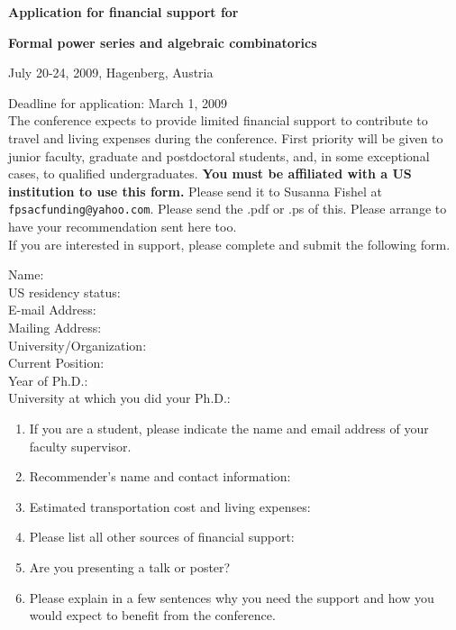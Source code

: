 \documentclass{article}
\begin{document}
\centerline{\bf \Large Application for financial support for}
\centerline{\bf \Large Formal power series and algebraic combinatorics}
\centerline{July 20-24, 2009, Hagenberg, Austria}
\medskip
\noindent Deadline for application: March 1, 2009
\medskip\\
\noindent The conference expects to provide limited financial support
to contribute to travel and living expenses during the
conference. First priority will be given to junior faculty, graduate
and postdoctoral students, and, in some exceptional cases, to
qualified undergraduates. {\bf You must be affiliated with a US
institution to use this form.} Please send it to Susanna Fishel at
{\tt fpsacfunding@yahoo.com}. Please send the .pdf or .ps of
this. Please arrange to have your recommendation sent here too.
\medskip\\
\noindent If you are interested in support, please complete and submit
the following form.
\medskip
\begin{description}
\item[Name:]  

\item[US residency status:]

\item[E-mail Address:]

\item[Mailing Address:]

\item[University/Organization:]

\item[Current Position:]

\item[Year of Ph.D.:]

\item[University at which you did your Ph.D.:]
\end{description}
\begin{enumerate}
\item If you are a student, please indicate the name and email address of
your faculty supervisor.

\item Recommender's name and contact information:

\item Estimated transportation cost and living expenses:
 
\item Please list all other sources of financial support:

\item Are you presenting a talk or poster?

\item Please explain in a few sentences why you need the support and how you would expect to benefit from the conference.
\end{enumerate}
\end{document}

